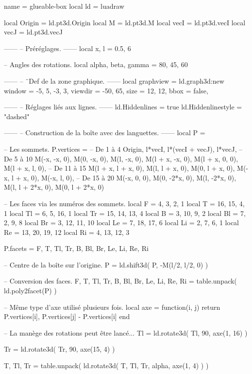 \documentclass[border = 3pt]{standalone}
\begin{document}
\begin{luadraw*}{name = glueable-box}
local ld = luadraw

local Origin = ld.pt3d.Origin
local M      = ld.pt3d.M
local vecI   = ld.pt3d.vecI
local vecJ   = ld.pt3d.vecJ

------
-- Préréglages.
------
local x, l = 0.5, 6

-- Angles des rotations.
local alpha, beta, gamma = 80, 45, 60

------
-- ¨Def de la zone graphique.
------
local graphview = ld.graph3d:new{
  window  = {-5, 5, -3, 3},
  viewdir = {-50, 65},
  size    = {12, 12},
  bbox    = false,
}

------
-- Réglages liés aux lignes.
------
ld.Hiddenlines     = true
ld.Hiddenlinestyle = "dashed"

------
-- Construction de la boîte avec des languettes.
------
local P = {}

-- Les sommets.
P.vertices = {
-- De 1 à 4
  Origin,
  l*vecI,
  l*(vecI + vecJ),
  l*vecJ,
-- De 5 à 10
  M(-x, -x, 0),
  M(0, -x, 0),
  M(l, -x, 0),
  M(l + x, -x, 0),
  M(l + x, 0, 0),
  M(l + x, l, 0),
-- De 11 à 15
  M(l + x, l + x, 0),
  M(l, l + x, 0),
  M(0, l + x, 0),
  M(-x, l + x, 0),
  M(-x, l, 0),
-- De 15 à 20
  M(-x, 0, 0),
  M(0, -2*x, 0),
  M(l, -2*x, 0),
  M(l, l + 2*x, 0),
  M(0, l + 2*x, 0)
}

-- Les faces via les numéros des sommets.
local F  = {4, 3, 2, 1}
local T  = {16, 15, 4, 1}
local Tl = {6, 5, 16, 1}
local Tr = {15, 14, 13, 4}
local B  = {3, 10, 9, 2}
local Bl = {7, 2, 9, 8}
local Br = {3, 12, 11, 10}
local Le = {7, 18, 17, 6}
local Li = {2, 7, 6, 1}
local Re = {13, 20, 19, 12}
local Ri = {4, 13, 12, 3}

P.facets = {
  F,
  T, Tl, Tr,
  B, Bl, Br,
  Le, Li,
  Re, Ri
}

-- Centre de la boîte sur l'origine.
P = ld.shift3d(
  P,
  -M(l/2, l/2, 0)
)

-- Conversion des faces.
F, T, Tl, Tr, B, Bl, Br, Le, Li, Re, Ri = table.unpack(
  ld.poly2facet(P)
)

-- Même type d'axe utilisé plusieurs fois.
local axe = function(i, j)
  return {
    P.vertices[i],
    P.vertices[j] - P.vertices[i]
  }
end

-- La manège des rotations peut être lancé...
Tl = ld.rotate3d(
  Tl,
  90, axe(1, 16)
)

Tr = ld.rotate3d(
  Tr,
  90, axe(15, 4)
)

T, Tl, Tr = table.unpack(
  ld.rotate3d(
    {T, Tl, Tr},
    alpha, axe(1, 4)
  )
)


\end{luadraw*}
\end{document}
